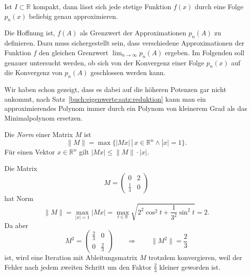 \begin{satz}
Ist $I\subset\mathbb{R}$ kompakt, dann lässt sich jede stetige Funktion
$f(x)$
durch eine Folge $p_n(x)$ beliebig genau approximieren.
\end{satz}

Die Hoffnung ist, $f(A)$ als Grenzwert der Approximationen $p_n(A)$
zu definieren.
Dazu muss sichergestellt sein, dass verschiedene Approximationen
der Funktion $f$ den gleichen Grenzwert $\lim_{n\to\infty}p_n(A)$ 
ergeben.
Im Folgenden soll genauer untersucht werden, ob sich von der
Konvergenz einer Folge $p_n(x)$ auf die Konvergenz von $p_n(A)$
geschlossen werden kann.

Wir haben schon gezeigt, dass es dabei auf die höheren Potenzen gar nicht
ankommt, nach Satz~\ref{buch:eigenwerte:satz:reduktion} kann man ein
approximierendes Polynom immer durch ein Polynom von kleinerem Grad
als das Minimalpolynom ersetzen.

\begin{definition}
%
Die {\em Norm} einer Matrix $M$ ist
\[
\|M\|
=
\max\{|Mx|\,|\, x\in\mathbb R^n\wedge |x|=1\}.
\]
Für einen Vektor $x\in\mathbb R^n$ gilt $|Mx| \le \|M\|\cdot |x|$.
\end{definition}

\begin{beispiel}
Die Matrix
\[
M=\begin{pmatrix}
0&2\\
\frac13&0
\end{pmatrix}
\]
hat Norm
\[
\|M\|
=
\max_{|x|=1} |Mx| 
=
\max_{t\in\mathbb R} \sqrt{2^2\cos^2 t +\frac1{3^2}\sin^2t} = 2.
\]
Da aber
\[
M^2 = \begin{pmatrix}
\frac{2}{3}&0\\
0&\frac{2}{3}
\end{pmatrix}
\qquad\Rightarrow\qquad \|M^2\|=\frac23
\]
ist, wird eine Iteration mit Ableitungsmatrix $M$ trotzdem
konvergieren, weil der Fehler nach jedem zweiten Schritt um den
Faktor $\frac23$ kleiner geworden ist.
\end{beispiel}

